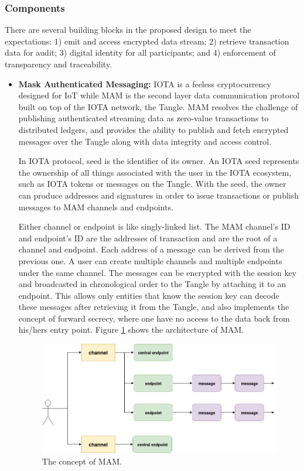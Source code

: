 \documentclass[journal,article,applsci,submit,moreauthors,pdftex]{Definitions/mdpi}
\begin{document}
\subsubsection{Components}
There are several building blocks in the proposed design to meet the expectations: 1) emit and access encrypted data stream; 2) retrieve transaction data for audit; 3) digital identity for all participants; and 4) enforcement of transparency and traceability.

\begin{itemize}[leftmargin=*,labelsep=5.8mm]
\item \textbf{Mask Authenticated Messaging: }
IOTA is a feeless cryptocurrency designed for IoT while MAM is the second layer data communication protocol built on top of the IOTA network, the Tangle. MAM resolves the challenge of publishing authenticated streaming data as zero-value transactions to distributed ledgers, and provides the ability to publish and fetch encrypted messages over the Tangle along with data integrity and access control.

In IOTA protocol, seed is the identifier of its owner. An IOTA seed represents the ownership of all things associated with the user in the IOTA ecosystem, such as IOTA tokens or messages on the Tangle. With the seed, the owner can produce addresses and signatures in order to issue transactions or publish messages to MAM channels and endpoints.

Either channel or endpoint is like singly-linked list. The MAM channel's ID and endpoint's ID are the addresses of transaction and are the root of a channel and endpoint. Each address of a message can be derived from the previous one. A user can create multiple channels and multiple endpoints under the same channel. The messages can be encrypted with the session key and broadcasted in chronological order to the Tangle by attaching it to an endpoint. This allows only entities that know the session key can decode these messages after retrieving it from the Tangle, and also implements the concept of forward secrecy, where one have no access to the data back from his/hers entry point. Figure \ref{fig:mam_struct} shows the architecture of MAM.

\begin{figure}[H]
    \centering
    \includegraphics[width=4.4 in]{mam_struct}
    \caption{The concept of MAM.}
    \label{fig:mam_struct}
\end{figure}


\end{itemize}
\end{document}
